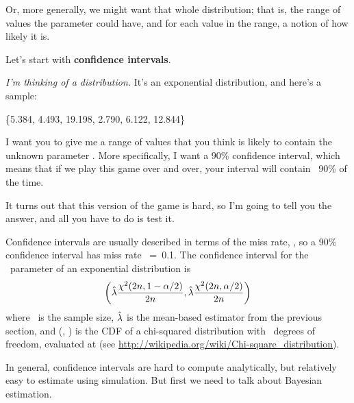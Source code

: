 \documentclass[12pt]{book}
\begin{document}
Or, more generally, we might want that whole distribution; that is,
the range of values the parameter could have, and for each value in
the range, a notion of how likely it is.

Let's start with {\bf confidence intervals}.

{\em I'm thinking of a distribution.}  It's an exponential distribution, and 
here's a sample:

\{5.384, 4.493, 19.198, 2.790, 6.122, 12.844\}

I want you to give me a range of values that you think is likely to
contain the unknown parameter \mylambda.  More specifically, I want
a 90\% confidence interval, which means that if we play this game over
and over, your interval will contain \mylambda~90\% of the time.

It turns out that this version of the game is hard, so I'm going
to tell you the answer, and all you have to do is test it.

Confidence intervals are usually described in terms of the miss rate,
\myalpha, so a 90\% confidence interval has miss rate \myalpha~=~0.1.
The confidence interval for the \mylambda~parameter of an exponential
distribution is
%
\[ \left( \hat{\lambda} \frac{\chi^2(2n, 1-\alpha/2)}{2n},
      \hat{\lambda} \frac{\chi^2(2n, \alpha/2)}{2n} \right) \]
%
where \n~is the sample size, $\hat{\lambda}$ is the mean-based estimator
from the previous section, and \mychi{}(\kk, \x) is the CDF of a
chi-squared distribution with \kk~degrees of freedom, evaluated at \x
(see \url{http://wikipedia.org/wiki/Chi-square_distribution}).

In general, confidence intervals are hard to compute analytically, but
relatively easy to estimate using simulation.  But first we need
to talk about Bayesian estimation.





\end{document}

